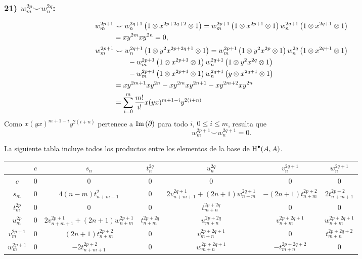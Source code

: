 \documentclass[fleqn,../tesis.tex]{subfiles}
\begin{document}
\subsubsection{21) $w_m^{2p} \smile w_n^{2q}$:}
\begin{align*}
	w_m^{2p + 1}&\smile w_n^{2q + 1}\left(1\otimes x^{2p + 2q + 2} \otimes 1\right)
		= w_m^{2p + 1}\left(1\otimes x^{2p + 1}\otimes 1\right)w_n^{2q + 1}\left(1\otimes x^{2q + 1}\otimes 1\right)\\
	&= xy^{2m}xy^{2n} = 0,
\end{align*}
\begin{align*}
	w_m^{2p + 1} &\smile w_n^{2q + 1}\left(1\otimes y^2x^{2p + 2q  + 1} \otimes 1\right)
		= w_m^{2p + 1}\left(1\otimes y^2x^{2p}\otimes 1\right)w_n^{2q} \left(1\otimes x^{2q + 1}\otimes 1\right)\\
	&\qquad - w_m^{2p + 1}\left(1 \otimes x^{2p + 1} \otimes 1\right)
		w_n^{2q + 1}\left(1\otimes y^2x^{2q}\otimes 1\right)\\
	&\qquad - w_m^{2p + 1}\left(1 \otimes x^{2p + 1} \otimes 1\right)
		w_n^{2q + 1}\left(y\otimes x^{2q + 1}\otimes 1\right)\\
	&= xy^{2m +1}xy^{2n} -xy^{2m}xy^{2n + 1} - xy^{2m + 2}xy^{2n}\\
	&= \sum_{i = 0}^{m }\frac{m!}{i!}x(yx)^{m  + 1 - i}y^{2(i + n)}
\end{align*}
Como $x(yx)^{m + 1 - i}y^{2(i + n)}$ pertenece a $\operatorname{Im}\left(\partial\right)$ para todo
$i$, $0 \leq i \leq m$,
resulta que \[w_m^{2p + 1} \smile w_n^{2q + 1} = 0.\]

La siguiente tabla incluye todos los productos entre los elementos de la base de $\operatorname{H}^{\bullet}(A, A)$.
\begin{center}
\begin{tabular}{ |c|c|c|c|c|c|c| } 
\hline
& $c$ & $s_n$ & $t_n^{2q}$ & $u_n^{2q}$ & $v_n^{2q + 1}$ & $w_n^{2q + 1}$ \\
\hline
$c$ & $0$ & $0$ & $ 0$ & $ 0$ & $0$ & $0$ \\
\hline
$s_m$ & $0$ & $4(n - m)t^{2}_{n + m + 1}$ & $0$ &
	$2v^{2q +1}_{n + m + 1} + (2n + 1)w_{n + m}^{2q + 1}$
		& $-(2n + 1)t_{n + m}^{2p + 2}$ & $2t_{n + m + 1}^{2p + 2}$ \\
\hline
$t_m^{2p}$ & $0$ & $0$ & $0$ & $t_{m + n}^{2p + 2q}$ & $0$ & $0$ \\
\hline
$u_m^{2p}$ & $0$ &$2v^{2p +1}_{n + m + 1} + (2n + 1)w_{n + m}^{2p + 1}$ & $t_{n + m}^{2p + 2q}$ &
	$u_{m + n}^{2p + 2q}$
		& $v_{n + m}^{2p + 2q + 1}$ & $w_{n + m}^{2p + 2q +1}$ \\
\hline
$v_m^{2p + 1}$ & $0$ &$(2n + 1)t_{n + m}^{2p + 2}$ & $0$ &
	$v_{m + n}^{2p + 2q + 1}$
		& $0$ & $t_{m + n}^{2p + 2q + 2}$ \\
\hline
$w_m^{2p + 1}$ & $0$ &$-2t_{n + m + 1}^{2p + 2}$ & $0$ &
	$w_{m + n}^{2p + 2q + 1}$
		& $-t_{m +n}^{2p + 2q + 2}$ & $0$\\
\hline
\end{tabular}
\end{center}
\end{document}
